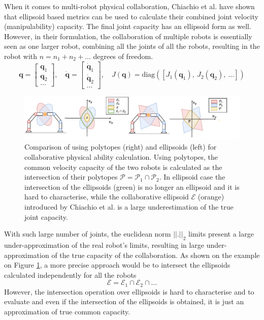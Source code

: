 When it comes to multi-robot physical collaboration, Chiachio et al. \cite{chiacchio_global_1991} have shown that ellipsoid based metrics can be used to calculate their combined joint velocity (manipulability) capacity. The final joint capacity has an ellipsoid form as well.  However, in their formulation, the collaboration of multiple robots is essentially seen as one larger robot, combining all the joints of all the robots, resulting in the robot with $n=n_1 + n_2 + \ldots$ degrees of freedom.
\begin{equation}
    \bm{q} = \begin{bmatrix}
        \bm{q}_1\\ \bm{q}_2 \\ \ldots
    \end{bmatrix}, \quad
    \dot{\bm{q}} = \begin{bmatrix}
        \dot{\bm{q}}_1\\\dot{\bm{q}}_2 \\ \ldots
    \end{bmatrix}, \quad
    J(\bm{q}) = \text{diag}([J_1(\bm{q}_1),~ J_2(\bm{q}_2),~\ldots])
\end{equation} 

\begin{figure}[!h]
    \centering
    \includegraphics[width=1.05\linewidth]{Chapters/imgs/collab_manip_poly.pdf}
    \caption{Comparison of using polytopes (right) and ellipsoids (left) for collaborative physical ability calculation. Using polytopes, the common velocity capacity of the two robots is calculated as the intersection of their polytopes $\mathcal{P}=\mathcal{P}_1 \cap \mathcal{P}_2$. In ellipsoid case the intersection of the ellipsoids (green) is no longer an ellipsoid and it is hard to characterise, while the collaborative ellipsoid $\mathcal{E}$ (orange) introduced by Chiachio et al. \cite{chiacchio_global_1991} is a large underestimation of the true joint capacity.}
    \label{fig:collab_mani_poly}
\end{figure}
With such large number of joints, the euclidean norm $||.||_2$ limits present a large under-approximation of the real robot's limits, resulting in large under-approximation of the true capacity of the collaboration. As shown on the example on Figure \ref{fig:collab_mani_poly}, a more precise approach would be to intersect the ellipsoids calculated independently for all the robots $$\mathcal{E}=\mathcal{E}_1 \cap \mathcal{E}_2  \cap \ldots$$ However, the intersection operation over ellipsoids is hard to characterise and to evaluate and even if the intersection of the ellipsoids is obtained, it is just an approximation of true common capacity. 

